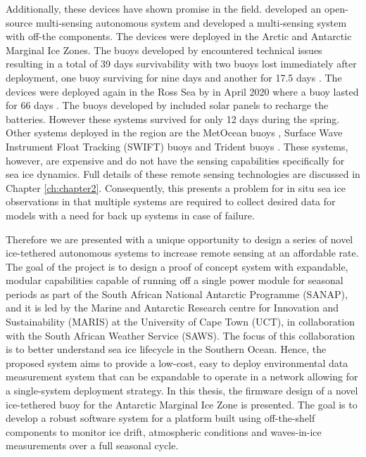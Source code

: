 Additionally, these devices have shown promise in the field. \textcite{rabault2019open} developed an open-source multi-sensing autonomous system and \textcite{kohout2015device} developed a multi-sensing system with off-the components. The devices were deployed in the Arctic and Antarctic Marginal Ice Zones. The buoys developed by \textcite{kohout2015device} encountered technical issues resulting in a total of 39 days survivability with two buoys lost immediately after deployment, one buoy surviving for nine days and another for 17.5 days \cite{kohout2015device}. The devices were deployed again in the Ross Sea by \textcite{kohout_smith_roach_williams_montiel_williams_2020} in April 2020 where a buoy lasted for 66 days \cite{kohout_smith_roach_williams_montiel_williams_2020}. The buoys developed by \textcite{rabault2019open} included solar panels to recharge the batteries. However these systems survived for only 12 days during the spring. Other systems deployed in the region are the MetOcean buoys \cite{uptempo}, Surface Wave Instrument Float Tracking (SWIFT) \cite{thomson2012wave} buoys and Trident buoys \cite{trident}. These systems, however, are expensive and do not have the sensing capabilities specifically for sea ice dynamics. Full details of these remote sensing technologies are discussed in Chapter \ref{ch:chapter2}. Consequently, this presents a problem for in situ sea ice observations in that multiple systems are required to collect desired data for models with a need for back up systems in case of failure. 

Therefore we are presented with a unique opportunity to design a series of novel ice-tethered autonomous systems to increase remote sensing at an affordable rate. The goal of the project is to design a proof of concept system with expandable, modular capabilities capable of running off a single power module for seasonal periods as part of the South African National Antarctic Programme (SANAP), and it is led by the Marine and Antarctic Research centre for Innovation and Sustainability (MARIS) at the University of Cape Town (UCT), in collaboration with the South African Weather Service (SAWS). The focus of this collaboration is to better understand sea ice lifecycle in the Southern Ocean. Hence, the proposed system aims to provide a low-cost, easy to deploy environmental data measurement system that can be expandable to operate in a network allowing for a single-system deployment strategy. In this thesis, the firmware design of a novel ice-tethered buoy for the Antarctic Marginal Ice Zone is presented. The goal is to develop a robust software system  for a platform built using off-the-shelf components to monitor ice drift, atmospheric conditions and waves-in-ice measurements over a full seasonal cycle.

